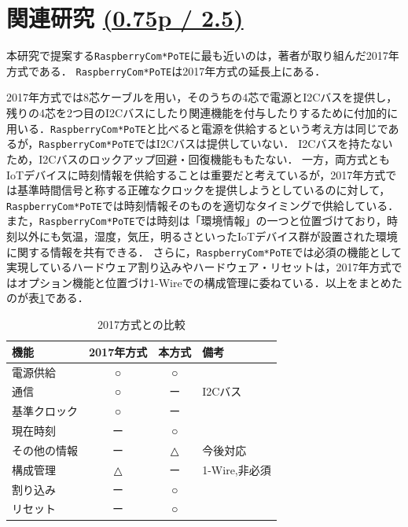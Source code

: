 \section{関連研究 \small{\underline{(0.75p / 2.5)}}}
\label{sec:03relatedworks}

本研究で提案する{\tt Raspberry\-Com*PoTE}に最も近いのは，著者が取り組んだ2017年方式である．
{\tt Raspberry\-Com*PoTE}は2017年方式の延長上にある．

2017年方式では8芯ケーブルを用い，そのうちの4芯で電源とI2Cバスを提供し，残りの4芯を2つ目のI2Cバスにしたり関連機能を付与したりするために付加的に用いる．{\tt Raspberry\-Com*PoTE}と比べると電源を供給するという考え方は同じであるが，{\tt Raspberry\-Com*PoTE}ではI2Cバスは提供していない．
I2Cバスを持たないため，I2Cバスのロックアップ回避・回復機能ももたない．
一方，両方式ともIoTデバイスに時刻情報を供給することは重要だと考えているが，2017年方式では基準時間信号と称する正確なクロックを提供しようとしているのに対して，{\tt Raspberry\-Com*PoTE}では時刻情報そのものを適切なタイミングで供給している．
また，{\tt Raspberry\-Com*PoTE}では時刻は「環境情報」の一つと位置づけており，時刻以外にも気温，湿度，気圧，明るさといったIoTデバイス群が設置された環境に関する情報を共有できる．
さらに，{\tt Raspberry\-Com*PoTE}では必須の機能として実現しているハードウェア割り込みやハードウェア・リセットは，2017年方式ではオプション機能と位置づけ1-Wireでの構成管理に委ねている．以上をまとめたのが表\ref{tb:T2017_vs_RaspberryComPoTE}である．


\begin{table}[h]
  \begin{center}
    \begin{tabular}{|l|c|c|l|} \hline
      機能 & 2017年方式 & 本方式 & 備考 \\
      \hline
      電源供給 & ○ & ○ &\\
      通信 & ○  & ー & I2Cバス\\
      基準クロック & ○ & ー &\\
      現在時刻 & ー & ○ &\\
      その他の情報 & ー & △&今後対応\\
      構成管理 & △ & ー & 1-Wire,非必須\\
      割り込み & ー & ○ &\\
      リセット & ー & ○ &\\
      \hline
    \end{tabular}
    \label{tb:T2017_vs_RaspberryComPoTE}
    \caption{2017方式との比較}
  \end{center}
\end{table}




